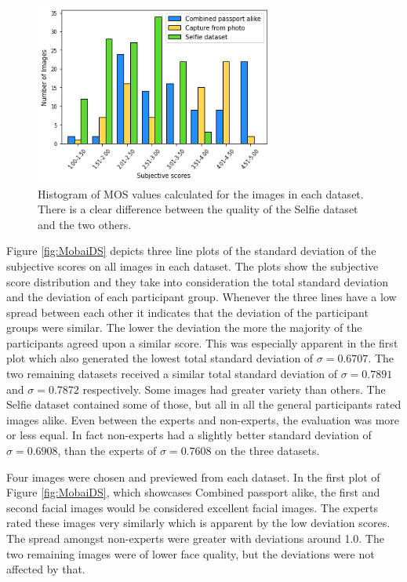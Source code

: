 \begin{figure}[h]
    \centering
    \includegraphics[width=0.7\textwidth]{figures/MobaiDS_Histogram.png}
    \caption{Histogram of MOS values calculated  for the images in each dataset. There is a clear difference between the quality of the Selfie dataset and the two others.}
    \label{fig:MobaiHistogram}
\end{figure}

Figure \ref{fig:MobaiDS} depicts three line plots of the standard deviation of the subjective scores on all images in each dataset. The plots show the subjective score distribution and they take into consideration the total standard deviation and the deviation of each participant group. Whenever the three lines have a low spread between each other it indicates that the deviation of the participant groups were similar. The lower the deviation the more the majority of the participants agreed upon a similar score. This was especially apparent in the first plot which also generated the lowest total standard deviation of $\sigma = 0.6707$. The two remaining datasets received a similar total standard deviation of $\sigma = 0.7891$ and $\sigma = 0.7872$ respectively. Some images had greater variety than others. The Selfie dataset contained some of those, but all in all the general participants rated images alike. Even between the experts and non-experts, the evaluation was more or less equal. In fact non-experts had a slightly better standard deviation of $\sigma = 0.6908$, than the experts of $\sigma = 0.7608$ on the three datasets. 

Four images were chosen and previewed from each dataset. In the first plot of Figure \ref{fig:MobaiDS}, which showcases Combined passport alike, the first and second facial images would be considered excellent facial images. The experts rated these images very similarly which is apparent by the low deviation scores. The spread amongst non-experts were greater with deviations around 1.0. The two remaining images were of lower face quality, but the deviations were not affected by that.  


